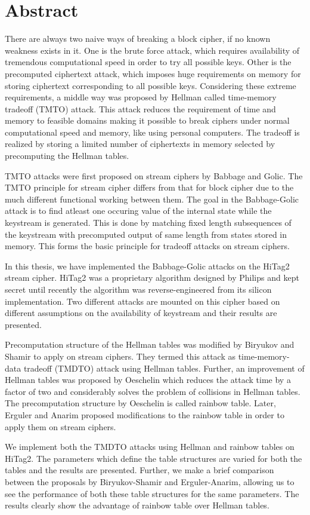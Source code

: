 

\chapter*{Abstract}

There are always two naive ways of breaking a block cipher, if no known weakness exists in it. One is the brute force attack, which requires availability of tremendous computational speed in order to try all possible keys. Other is the precomputed ciphertext attack, which imposes huge requirements on memory for storing ciphertext corresponding to all possible keys. Considering these extreme requirements, a middle way was proposed by Hellman called time-memory tradeoff (TMTO) attack. This attack reduces the requirement of time and memory to feasible domains making it possible to break ciphers under normal computational speed and memory, like using personal computers. The tradeoff is realized by storing a limited number of ciphertexts in memory selected by precomputing the Hellman tables.

TMTO attacks were first proposed on stream ciphers by Babbage and Golic. The TMTO principle for stream cipher differs from that for block cipher due to the much different functional working between them. The goal in the Babbage-Golic attack is to find atleast one occuring value of the internal state while the keystream is generated. This is done by matching fixed length subsequences of the keystream with precomputed output of same length from states stored in memory. This forms the basic principle for tradeoff attacks on stream ciphers. 

In this thesis, we have implemented the Babbage-Golic attacks on the HiTag2 stream cipher. HiTag2 was a proprietary algorithm designed by Philips and kept secret until recently the algorithm was reverse-engineered from its silicon implementation. Two different attacks are mounted on this cipher based on different assumptions on the availability of keystream and their results are presented. 

Precomputation structure of the Hellman tables was modified by Biryukov and Shamir to apply on stream ciphers. They termed this attack as time-memory-data tradeoff (TMDTO) attack using Hellman tables. Further, an improvement of Hellman tables was proposed by Oeschelin which reduces the attack time by a factor of two and considerably solves the problem of collisions in Hellman tables. The precomputation structure by Oeschelin is called rainbow table. Later, Erguler and Anarim proposed modifications to the rainbow table in order to apply them on stream ciphers.

We implement both the TMDTO attacks using Hellman and rainbow tables on HiTag2. The parameters which define the table structures are varied for both the tables and the results are presented. Further, we make a brief comparison between the proposals by Biryukov-Shamir and Erguler-Anarim, allowing us to see the performance of both these table structures for the same parameters. The results clearly show the advantage of rainbow table over Hellman tables.